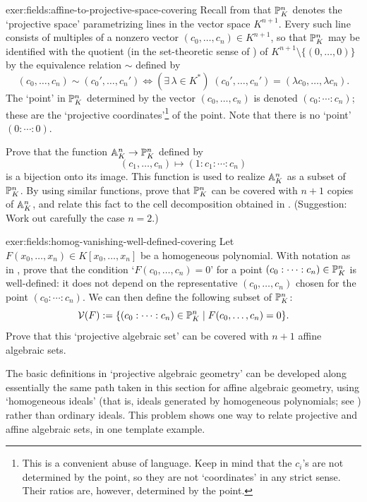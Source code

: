 \begin{exer}{}{exer:fields:affine-to-projective-space-covering}
  Recall from  that
  $\P^n_K$ denotes the `projective space' parametrizing lines in the
  vector space $K^{n+1}$.  Every such line consists of multiples of a
  nonzero vector $(c_0, \dots, c_n) \in K^{n+1}$, so that $\P^n_K$ may
  be identified with the quotient (in the set-theoretic sense of
  ) of
  $K^{n+1} \setminus \{(0, \dots, 0)\}$ by the equivalence relation
  $\sim$ defined by
  \[
    (c_0, \dots, c_n) \sim (c_0', \dots, c_n') \iff (\exists\, \lambda
    \in K^*)\; (c_0', \dots, c_n') = (\lambda c_0, \dots, \lambda
    c_n).
  \]
  The `point' in $\P^n_K$ determined by the vector $(c_0, \dots, c_n)$
  is denoted $(c_0 : \cdots : c_n)$; these are the `projective
  coordinates'\footnote{This is a convenient abuse of language. Keep
    in mind that the $c_i$'s are not determined by the point, so they
    are not `coordinates' in any strict sense. Their ratios are,
    however, determined by the point.} of the point. Note that there
  is no `point' $(0 : \cdots : 0)$.

  Prove that the function $\A^n_K \to \P^n_K$ defined by
  \[
    (c_1, \dots, c_n) \mapsto (1 : c_1 : \cdots : c_n)
  \]
  is a bijection onto its image. This function is used to realize $\A^n_K$ as a
  subset of $\P^n_K$. By using similar functions, prove that $\P^n_K$
  can be covered with $n+1$ copies of $\A^n_K$, and relate this fact
  to the cell decomposition obtained in
  . (Suggestion:
  Work out carefully the case $n = 2$.)
\end{exer}

\begin{exer}{}{exer:fields:homog-vanishing-well-defined-covering}
  Let $F(x_0, \dots, x_n) \in K[x_0, \dots, x_n]$ be a homogeneous
  polynomial. With notation as in
  , prove that
  the condition `$F(c_0, \dots, c_n) = 0$' for a point
  $(c_0 : \cdots : c_n) \in \P^n_K$ is well-defined: it does not
  depend on the representative $(c_0, \dots, c_n)$ chosen for the
  point $(c_0 : \cdots : c_n)$. We can then define the following
  subset of $\P^n_K$:
  \[
    \mathcal{V}(F) := \{(c_0 : \cdots : c_n) \in \P^n_K \mid
    F(c_0,\dots,c_n)=0\}.
  \]
  Prove that this `projective algebraic set' can be covered with $n+1$
  affine algebraic sets.

  The basic definitions in `projective algebraic geometry' can be
  developed along essentially the same path taken in this section for
  affine algebraic geometry, using `homogeneous ideals' (that is,
  ideals generated by homogeneous polynomials; see
  ) rather
  than ordinary ideals. This problem shows one way to relate
  projective and affine algebraic sets, in one template example.
\end{exer}

